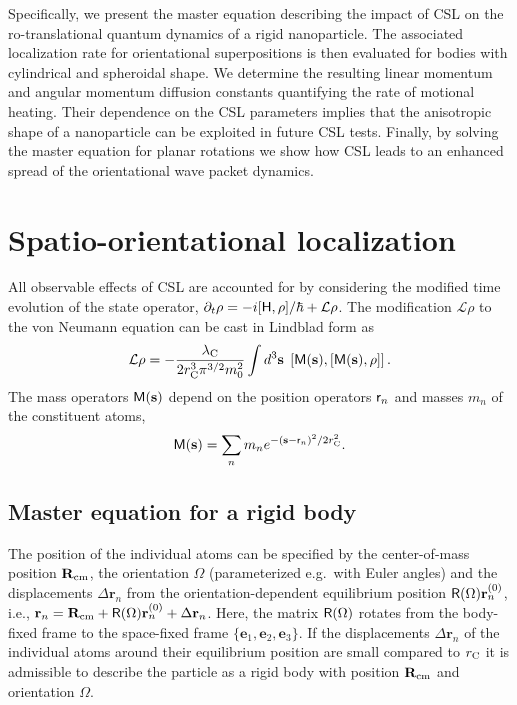\documentclass[%
 twocolumn,
 amsmath,amssymb,
 aps,
 pra,
]{revtex4-1}
\newcommand{\op}[1]{{\sf #1}}
\begin{document}
Specifically, we present the master equation describing the impact of CSL on the ro-translational quantum dynamics of a rigid nanoparticle. The associated localization rate for orientational superpositions is then evaluated for bodies with cylindrical and spheroidal shape.
We determine the resulting linear momentum and angular momentum diffusion constants quantifying the rate of motional heating. Their dependence on the CSL parameters implies that the anisotropic shape of a nanoparticle can be exploited in future CSL tests. Finally, by solving the master equation for planar rotations we show how CSL leads to an enhanced spread of the orientational wave packet dynamics.


\section{Spatio-orientational localization}

All observable effects of CSL are accounted for by considering the modified time evolution of the state operator, $\partial_t\rho=-i[\op{H},\rho]/\hbar+\mathcal{L}\rho$. The modification $\mathcal{L}\rho$ to the von Neumann equation can be cast in Lindblad form as \cite{bassi2003dynamical}
\begin{equation} \label{eq:csl1}
\mathcal{L}\rho=-\frac{\lambda_{\rm C}}{2r_{\rm C}^3\pi^{3/2}m_0^2}
\int d^3\textbf{s}\hspace{1mm}\left[\op{M}(\textbf{s}),\left[\op{M}(\textbf{s}),\rho\right]\right].
\end{equation}
The mass operators $\op{M}(\textbf{s})$ depend on the position operators $\op{r}_n$ and masses $m_n$ of the constituent atoms,
\begin{equation}
\op{M}(\textbf{s})=\sum_n m_n e^{-(\textbf{s}-\op{r}_n)^2/2r^2_{\rm C}}.
\end{equation}

\subsection{Master equation for a rigid body}

The  position of the individual atoms can be specified by the center-of-mass position $\textbf{R}_{\rm cm}$, the orientation $\Omega$  (parameterized e.g.\ with Euler angles) and the displacements $\Delta \textbf{r}_n$ from the orientation-dependent equilibrium position $\op{R}({\Omega})\textbf{r}_n^{(0)}$, i.e., $\textbf{r}_n= \textbf{R}_{\rm cm} + \op{R}({\Omega})\textbf{r}_n^{(0)}+\Delta\textbf{r}_n$. Here, the matrix $\op{R}(\Omega)$ rotates from the body-fixed frame to the space-fixed frame $\{\textbf{e}_1,\textbf{e}_2,\textbf{e}_3\}$. 
If the displacements $\Delta\textbf{r}_n$ of the individual atoms around their equilibrium position are small compared to $r_{\rm C}$ it is admissible to describe the particle as a rigid body with position $\textbf{R}_{\rm cm}$ and orientation $\Omega$.
\end{document}
